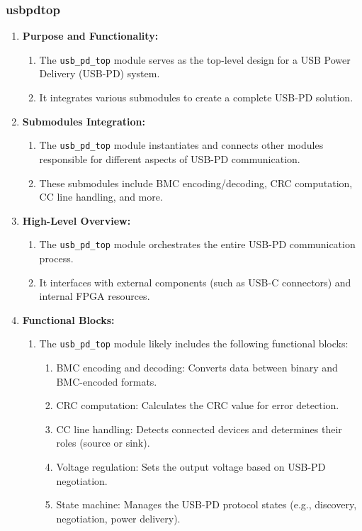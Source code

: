 \subsubsection{usb\textunderscore pd\textunderscore top}
\begin{enumerate}
    \item \textbf{Purpose and Functionality:}
    \begin{enumerate}
        \item The \texttt{usb\_pd\_top} module serves as the top-level design for a USB Power Delivery (USB-PD) system.
        \item It integrates various submodules to create a complete USB-PD solution.
    \end{enumerate}

    \item \textbf{Submodules Integration:}
    \begin{enumerate}
        \item The \texttt{usb\_pd\_top} module instantiates and connects other modules responsible for different aspects of USB-PD communication.
        \item These submodules include BMC encoding/decoding, CRC computation, CC line handling, and more.
    \end{enumerate}

    \item \textbf{High-Level Overview:}
    \begin{enumerate}
        \item The \texttt{usb\_pd\_top} module orchestrates the entire USB-PD communication process.
        \item It interfaces with external components (such as USB-C connectors) and internal FPGA resources.
    \end{enumerate}

    \item \textbf{Functional Blocks:}
    \begin{enumerate}
        \item The \texttt{usb\_pd\_top} module likely includes the following functional blocks: 
        \begin{enumerate}
            \item BMC encoding and decoding: Converts data between binary and BMC-encoded formats.
            \item CRC computation: Calculates the CRC value for error detection.
            \item CC line handling: Detects connected devices and determines their roles (source or sink).
            \item Voltage regulation: Sets the output voltage based on USB-PD negotiation.
            \item State machine: Manages the USB-PD protocol states (e.g., discovery, negotiation, power delivery).
        \end{enumerate}
    \end{enumerate}
\end{enumerate}


